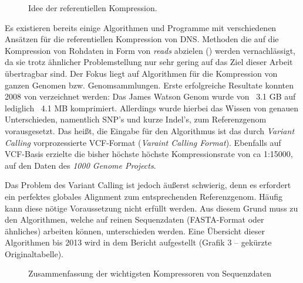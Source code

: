 \documentclass[12pt]{article}
\begin{document}
\begin{figure}
\caption{\label{fig:refKomp}Idee der referentiellen Kompression. }
\end{figure}

Es existieren bereits einige Algorithmen und Programme mit verschiedenen Ansätzen für die referentiellen Kompression von DNS. Methoden die auf die Kompression von Rohdaten in Form von \textit{reads} abzielen (\cite{deorowicz11fastq}) werden vernachlässigt, da sie trotz ähnlicher Problemstellung nur sehr gering auf das Ziel dieser Arbeit übertragbar sind. Der Fokus liegt auf Algorithmen für die Kompression von ganzen Genomen bzw. Genomsammlungen.
Erste erfolgreiche Resultate konnten 2008 von \cite{christley09email} verzeichnet werden: Das James Watson Genom wurde von ~3.1 GB auf lediglich ~4.1 MB komprimiert. Allerdings wurde hierbei das Wissen von genauen Unterschieden, namentlich SNP's und kurze Indel's, zum Referenzgenom vorausgesetzt. Das heißt, die Eingabe für den Algorithmus ist das durch \textit{Variant Calling} vorprozessierte VCF-Format (\textit{Varaint Calling Format}). Ebenfalls auf VCF-Basis erzielte \cite{deorowicz13TDC} die bisher höchste höchste Kompressionsrate von ca 1:15000, auf den Daten des \textit{1000 Genome Projects}.

Das Problem des Variant Calling ist jedoch äußerst schwierig, denn es erfordert ein perfektes globales Alignment zum entsprechenden Referenzgenom. Häufig kann diese nötige Voraussetzung  nicht erfüllt werden. Aus diesem Grund muss zu den Algorithmen, welche auf reinen Sequenzdaten (FASTA-Format oder ähnliches) arbeiten können, unterschieden werden. Eine Übersicht dieser Algorithmen bis 2013 wird in dem Bericht \cite{deorowicz13info} aufgestellt (Grafik 3 – gekürzte Originaltabelle).

\begin{figure}
\caption{\label{fig:seqComp} Zusammenfassung der wichtigsten Kompressoren von Sequenzdaten}
\end{figure}
\end{document}
